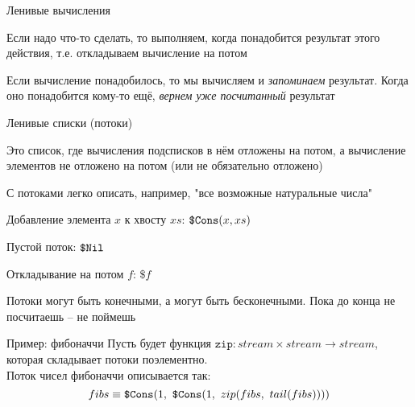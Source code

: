 \begin{frame}{Ленивые вычисления}

\begin{idea}
Если надо что-то сделать, то выполняем, когда понадобится результат этого действия, т.е. откладываем вычисление на потом
\end{idea}

\begin{idea}
Если вычисление понадобилось, то мы вычисляем и \emph{запоминаем} результат. Когда оно понадобится кому-то ещё, \emph{вернем уже посчитанный} результат
\end{idea}

\end{frame}

\begin{frame}{Ленивые списки (потоки)}
\begin{definition}
Это список, где вычисления подсписков в нём отложены на потом, а вычисление элементов не отложено на потом (или не обязательно отложено)
\end{definition}
С потоками легко описать, например, "все возможные натуральные числа"\vspace{1em}

\begin{notation}
Добавление элемента $x$ к хвосту $xs$: $\texttt{\$Cons}(x,xs)$

Пустой поток: $\texttt{\$Nil}$

Откладывание на потом $f$: $\texttt{\$}f$
\end{notation}
\begin{remark}
Потоки могут быть конечными, а могут быть бесконечными. Пока до конца не посчитаешь -- не поймешь
\end{remark}
\end{frame}

\begin{frame}{Пример: фибоначчи}
Пусть будет функция $\texttt{zip}: stream\times stream \rightarrow stream$, которая складывает потоки поэлементно.\\

Поток чисел фибоначчи описывается так:
\[
fibs \equiv \texttt{\$Cons}(1,\ \texttt{\$Cons}(1,\ zip(fibs,\ tail(fibs))))
\]
\begin{center}


\end{center}
\end{frame}
